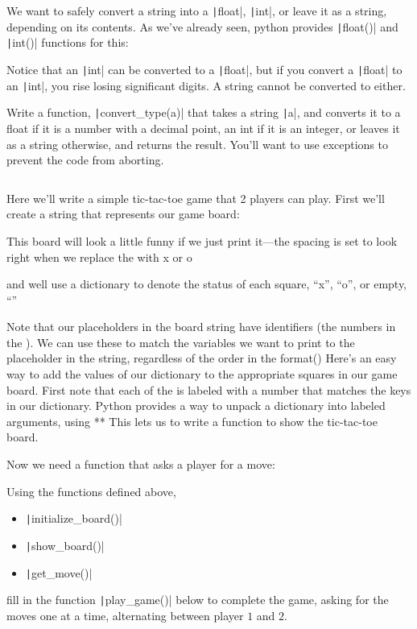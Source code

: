 \begin{questions}
	\question

	We want to safely convert a string into a \texttt|float|,
	\texttt|int|, or leave it as a string, depending on its contents.
	As we've already seen, python provides \texttt|float()|
	and \texttt|int()| functions for this:

	Notice that an \texttt|int| can be converted to a
	\texttt|float|, but if you convert a
	\texttt|float| to an \texttt|int|, you rise
	losing significant digits.
	A string cannot be converted to either.

	Write a function, \texttt|convert_type(a)| that takes a
	string \texttt|a|, and converts it to a float if it is
	a number with a decimal point, an int if it is an integer, or
	leaves it as a string otherwise, and returns the result.
	You'll want to use exceptions to prevent the code from aborting.

	\inputminted[fontsize=\tiny,linenos]{python}{q10.py}

	\question

	Here we'll write a simple tic-tac-toe game that 2 players can play.
	First we'll create a string that represents our game board:

	This board will look a little funny if we just print it—the spacing is set to look right when we replace the {} with x or o

	and well use a dictionary to denote the status of each square, “x”, “o”, or empty, “”

	Note that our {} placeholders in the board string have identifiers (the numbers in the {}).
	We can use these to match the variables we want to print to the placeholder in the string,
	regardless of the order in the format()
	Here’s an easy way to add the values of our dictionary to the appropriate squares in our game board. First note that each of the {} is labeled with a number that matches the keys in our dictionary.
	Python provides a way to unpack a dictionary into labeled arguments, using **
	This lets us to write a function to show the tic-tac-toe board.

	Now we need a function that asks a player for a move:

	Using the functions defined above,

	\begin{itemize}
		\item \texttt|initialize_board()|
		\item \texttt|show_board()|
		\item \texttt|get_move()|
	\end{itemize}
	fill in the function \texttt|play_game()| below to complete the game,
	asking for the moves one at a time, alternating between player $1$ and $2$.


\end{questions}
